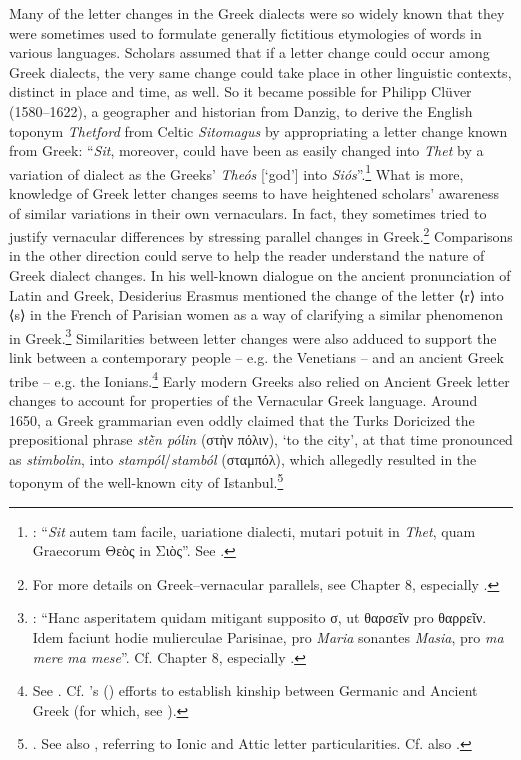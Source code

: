 Many of the letter changes in the Greek dialects were so widely known that they were sometimes used to formulate generally fictitious etymologies of words in various languages. Scholars assumed that if a letter change could occur among Greek dialects, the very same change could take place in other linguistic contexts, distinct in place and time, as well. So it became possible for Philipp Clüver (1580–1622), a geographer and historian from Danzig, to derive the English toponym \textit{Thetford} from Celtic \textit{Sitomagus} by appropriating a letter change known from Greek: “\textit{Sit}, moreover, could have been as easily changed into \textit{Thet} by a variation of dialect as the Greeks’ \textit{Theós} [`god'] into \textit{Siós}”.\footnote{{\citet[64]{Cluver1616}: “}{\textit{Sit}} {autem tam facile, uariatione dialecti, mutari potuit in} {\textit{Thet}}{, quam Graecorum Θεὸς in Σιὸς”. See \citet[114--115]{Metcalf2013}.}} What is more, knowledge of Greek letter changes seems to have heightened scholars’ awareness of similar variations in their own vernaculars. In fact, they sometimes tried to justify vernacular differences by stressing parallel changes in Greek.\footnote{{For more details on Greek–vernacular parallels, see Chapter 8, especially .}} Comparisons in the other direction could serve to help the reader understand the nature of Greek dialect changes. In his well-known dialogue on the ancient pronunciation of Latin and Greek, Desiderius Erasmus mentioned the change of the letter ⟨r⟩ into ⟨s⟩ in the French of Parisian women as a way of clarifying a similar phenomenon in Greek.\footnote{{\citet[52]{Erasmus1528}: “Hanc asperitatem quidam mitigant supposito σ, ut θαρσεῖν pro θαρρεῖν. Idem faciunt hodie mulierculae Parisinae, pro} {\textit{Maria}} {sonantes} {\textit{Masia}}{, pro} {\textit{ma mere ma mese}}{”. Cf. Chapter 8, especially .}} Similarities between letter changes were also adduced to support the link between a contemporary people – e.g. the Venetians – and an ancient Greek tribe – e.g. the Ionians.\footnote{{See . Cf. \citeauthor{Reitz1730}'s (\citeyear[e.g., 122, 125, 126–127]{Reitz1730}) efforts to establish kinship between Germanic and Ancient Greek (for which, see \citealt{VanHal2016}).}} Early modern Greeks also relied on Ancient Greek letter changes to account for properties of the Vernacular Greek language. Around 1650, a Greek grammarian even oddly claimed that the Turks Doricized the prepositional phrase \textit{stḕn pólin} (στὴν πόλιν), ‘to the city’, at that time pronounced as \textit{stimbolin}, into \textit{stampól}/\textit{stamból} (σταμπόλ), which allegedly resulted in the toponym of the well-known city of Istanbul.\footnote{{\citet[14]{Nikiforos1908}. See also \citet[35]{Nikiforos1908}, referring to Ionic and Attic letter particularities. Cf.} also \citet[\textsc{a.4}\textsc{\textsuperscript{r}}]{Rodigast1685}.}


